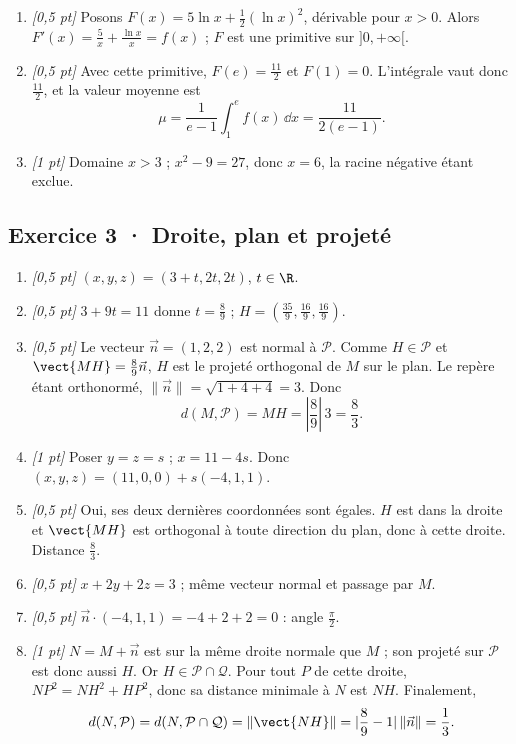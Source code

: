 \begin{enumerate}
\item \textit{[0,5 pt]} Posons $F(x)=5\ln x+\frac12(\ln x)^2$, dérivable pour $x>0$. Alors $F'(x)=\frac{5}{x}+\frac{\ln x}{x}=f(x)$ ; $F$ est une primitive sur $]0,+\infty[$.

\item \textit{[0,5 pt]} Avec cette primitive, $F(e)=\frac{11}{2}$ et $F(1)=0$. L'intégrale vaut donc $\frac{11}{2}$, et la valeur moyenne est
\[\mu=\frac{1}{e-1}\int_1^e f(x)\,\dd x=\frac{11}{2(e-1)}.\]

\item \textit{[1 pt]} Domaine $x>3$ ; $x^2-9=27$, donc $x=6$, la racine négative étant exclue.

\end{enumerate}

\subsection*{Exercice 3 · Droite, plan et projeté}\begin{enumerate}

\item \textit{[0,5 pt]} $(x,y,z)=(3+t,2t,2t)$, $t\in\R$.

\item \textit{[0,5 pt]} $3+9t=11$ donne $t=\frac{8}{9}$ ; $H=(\frac{35}{9},\frac{16}{9},\frac{16}{9})$.

\item \textit{[0,5 pt]} Le vecteur $\vec n=(1,2,2)$ est normal à $\mathcal P$. Comme $H\in\mathcal P$ et $\vect{MH}=\frac{8}{9}\vec n$, $H$ est le projeté orthogonal de $M$ sur le plan. Le repère étant orthonormé, $\|\vec n\|=\sqrt{1+4+4}=3$. Donc
\[d(M,\mathcal P)=MH=|\frac{8}{9}|\,3=\frac{8}{3}.\]

\item \textit{[1 pt]} Poser $y=z=s$ ; $x=11-4s$. Donc $(x,y,z)=(11,0,0)+s(-4,1,1)$.

\item \textit{[0,5 pt]} Oui, ses deux dernières coordonnées sont égales. $H$ est dans la droite et $\vect{MH}$ est orthogonal à toute direction du plan, donc à cette droite. Distance $\frac{8}{3}$.

\item \textit{[0,5 pt]} $x+2y+2z=3$ ; même vecteur normal et passage par $M$.

\item \textit{[0,5 pt]} $\vec n\cdot(-4,1,1)=-4+2+2=0$ : angle $\frac{\pi}{2}$.

\item \textit{[1 pt]} $N=M+\vec n$ est sur la même droite normale que $M$ ; son projeté sur $\mathcal P$ est donc aussi $H$. Or $H\in\mathcal P\cap\mathcal Q$. Pour tout $P$ de cette droite, $NP^2=NH^2+HP^2$, donc sa distance minimale à $N$ est $NH$. Finalement,
\[d(N,\mathcal P)=d(N,\mathcal P\cap\mathcal Q)=\|\vect{NH}\|=|\frac{8}{9}-1|\,\|\vec n\|=\frac{1}{3}.\]

\end{enumerate}


